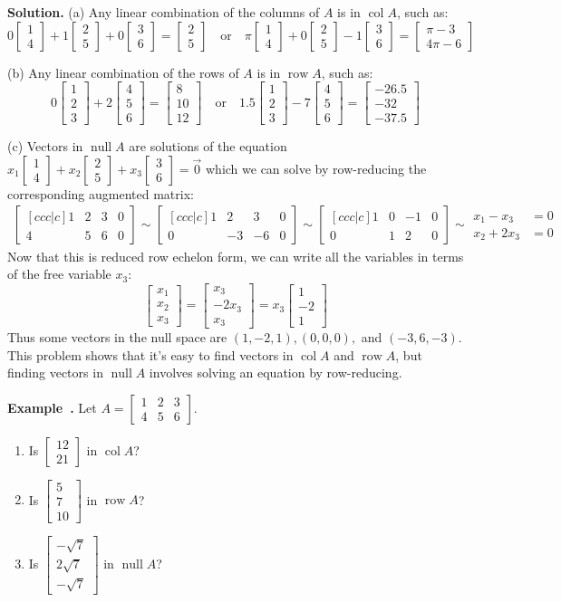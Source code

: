 \documentclass[11pt, letterpaper]{report}
\newenvironment{notes}{}{}
\newenvironment{book}{}{}
\newcounter{example}[section]
\newcommand{\example}{\refstepcounter{example}%
\par\noindent\textbf{Example~\theexample.} }
\DeclareMathOperator{\col}{col}
\DeclareMathOperator{\row}{row}
\DeclareMathOperator{\nul}{null}
\newcommand{\bbvec}[2]{
  \begin{bmatrix} #1 \\ #2 \end{bmatrix}
}
\newcommand{\bbbvec}[3]{
  \begin{bmatrix} #1 \\ #2 \\ #3 \end{bmatrix}
}
\begin{document}
\begin{book}
\textbf{Solution.} (a) Any linear combination of the columns of $A$ is in $\col A$, such as:
\[0 \bbvec{1}{4} + 1 \bbvec{2}{5} + 0 \bbvec{3}{6} = \bbvec{2}{5} \quad \text{or} \quad 
\pi \bbvec{1}{4} + 0 \bbvec{2}{5} - 1\bbvec{3}{6} = \bbvec{\pi-3}{4\pi-6} \]

(b) Any linear combination of the rows of $A$ is in $\row A$, such as:
\[0 \bbbvec{1}{2}{3} + 2 \bbbvec{4}{5}{6} = \bbbvec{8}{10}{12} \quad \text{or} \quad
1.5 \bbbvec{1}{2}{3} -7 \bbbvec{4}{5}{6} = \bbbvec{-26.5}{-32}{-37.5}\]

(c) Vectors in $\nul A$ are solutions of the equation $x_1 \bbvec{1}{4} + x_2 \bbvec{2}{5} + x_3 \bbvec{3}{6}= \vec{0}$ which we can solve by row-reducing the corresponding augmented matrix:
\begin{align*}
\begin{bmatrix}[ccc|c]
1 & 2 & 3 & 0 \\
4 & 5 & 6 & 0
\end{bmatrix} \sim \begin{bmatrix}[ccc|c]
1 & 2 & 3 & 0 \\
0 & -3 & -6 & 0
\end{bmatrix} \sim \begin{bmatrix}[ccc|c]
1 & 0 & -1 & 0 \\
0 & 1 & 2 & 0
\end{bmatrix} \sim
\begin{aligned}
x_1-x_3&=0 \\
x_2+2x_3&=0
\end{aligned}
\end{align*}
Now that this is reduced row echelon form, we can write all the variables in terms of the free variable $x_3$:
\[\bbbvec{x_1}{x_2}{x_3} = \bbbvec{x_3}{-2x_3}{x_3} = x_3\bbbvec{1}{-2}{1}\]
Thus some vectors in the null space are $(1,-2,1), (0,0,0),$ and $(-3,6,-3)$. This problem shows that it's easy to find vectors in $\col A$ and $\row A$, but finding vectors in $\nul A$ involves solving an equation by row-reducing. \blacksquare
\end{book}

\example {}   Let $A =\begin{bmatrix}
1 & 2 & 3 \\
4 & 5 & 6
\end{bmatrix}$. 

\begin{enumerate}[label=(\alph*)]
\item Is $\bbvec{12}{21}$ in $\col A$?
\begin{notes}
\vfill
\end{notes}
\item Is $\bbbvec{5}{7}{10}$ in $\row A$?
\begin{notes}
\vfill
\end{notes}
\item Is $\bbbvec{-\sqrt{7}}{2\sqrt{7}}{-\sqrt{7}}$ in $\nul A$?
\end{enumerate}
\end{document}
